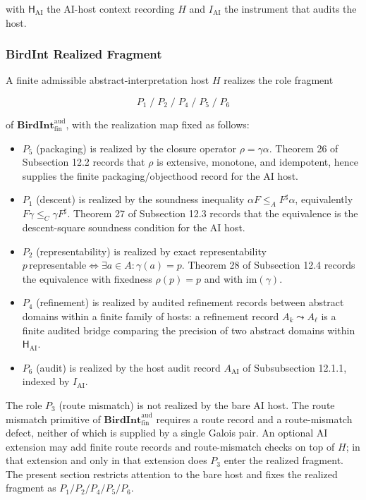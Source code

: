 \documentclass[11pt]{article}
\providecommand{\tightlist}{}
\theoremstyle{definition}
\begin{document}
with \(\mathsf H_{\mathrm{AI}}\) the AI-host context recording \(H\) and \(I_{\mathrm{AI}}\) the instrument that audits the host.

\subsubsection{BirdInt Realized Fragment}

A finite admissible abstract-interpretation host \(H\) realizes the role fragment

\[
P_1\;/\;P_2\;/\;P_4\;/\;P_5\;/\;P_6
\]

of \(\mathbf{BirdInt}^{\mathrm{aud}}_{\mathrm{fin}}\), with the realization map fixed as follows:

\begin{itemize}
\tightlist
\item
  \(P_5\) (packaging) is realized by the closure operator \(\rho=\gamma\alpha\). Theorem 26 of Subsection 12.2 records that \(\rho\) is extensive, monotone, and idempotent, hence supplies the finite packaging/objecthood record for the AI host.
\item
  \(P_1\) (descent) is realized by the soundness inequality \(\alpha F\le_A F^{\sharp}\alpha\), equivalently \(F\gamma\le_C\gamma F^{\sharp}\). Theorem 27 of Subsection 12.3 records that the equivalence is the descent-square soundness condition for the AI host.
\item
  \(P_2\) (representability) is realized by exact representability \(p\,\text{representable}\iff\exists a\in A:\gamma(a)=p\). Theorem 28 of Subsection 12.4 records the equivalence with fixedness \(\rho(p)=p\) and with \(\mathrm{im}(\gamma)\).
\item
  \(P_4\) (refinement) is realized by audited refinement records between abstract domains within a finite family of hosts: a refinement record \(A_k\leadsto A_\ell\) is a finite audited bridge comparing the precision of two abstract domains within \(\mathsf H_{\mathrm{AI}}\).
\item
  \(P_6\) (audit) is realized by the host audit record \(A_{\mathrm{AI}}\) of Subsubsection 12.1.1, indexed by \(I_{\mathrm{AI}}\).
\end{itemize}

The role \(P_3\) (route mismatch) is not realized by the bare AI host. The route mismatch primitive of \(\mathbf{BirdInt}^{\mathrm{aud}}_{\mathrm{fin}}\) requires a route record and a route-mismatch defect, neither of which is supplied by a single Galois pair. An optional AI extension may add finite route records and route-mismatch checks on top of \(H\); in that extension and only in that extension does \(P_3\) enter the realized fragment. The present section restricts attention to the bare host and fixes the realized fragment as \(P_1/P_2/P_4/P_5/P_6\).
\end{document}
